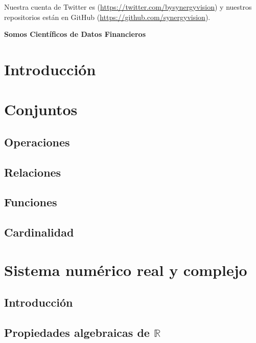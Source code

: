 \documentclass[12pt,]{krantz}
\theoremstyle{definition}
\theoremstyle{definition}
\theoremstyle{definition}
\theoremstyle{remark}
\begin{document}
Nuestra cuenta de Twitter es (\url{https://twitter.com/bysynergyvision})
y nuestros repositorios están en GitHub
(\url{https://github.com/synergyvision}).

\textbf{Somos Científicos de Datos Financieros}

\mainmatter

\chapter{Introducción}\label{introduccion}

\chapter{Conjuntos}\label{conjuntos}

\section{Operaciones}\label{operaciones}

\section{Relaciones}\label{relaciones}

\section{Funciones}\label{funciones}

\section{Cardinalidad}\label{cardinalidad}

\chapter{Sistema numérico real y
complejo}\label{sistema-numerico-real-y-complejo}

\section{Introducción}\label{introduccion-1}

\section{\texorpdfstring{Propiedades algebraicas de
\(\mathbb{R}\)}{Propiedades algebraicas de \textbackslash{}mathbb\{R\}}}\label{propiedades-algebraicas-de-mathbbr}
\end{document}
